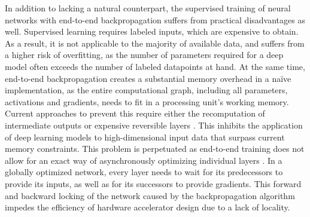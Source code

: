 \documentclass{article}
\begin{document}
In addition to lacking a natural counterpart, the supervised training of neural networks with end-to-end backpropagation suffers from practical disadvantages as well. 
Supervised learning requires labeled inputs, which are expensive to obtain. As a result, it is not applicable to the majority of available data, and suffers from a higher risk of overfitting, as the number of parameters required for a deep model often exceeds the number of labeled datapoints at hand.
At the same time, end-to-end backpropagation creates a substantial memory overhead in a na\"ive implementation, as the entire computational graph, including all parameters, activations and gradients, needs to fit in a processing unit's working memory. Current approaches to prevent this require either the recomputation of intermediate outputs \citep{salimans2017gradient} or expensive reversible layers \citep{Jacobsen2018-ra}. This inhibits the application of deep learning models to high-dimensional input data that surpass current memory constraints. This problem is perpetuated as end-to-end training does not allow for an exact way of asynchronously optimizing individual layers \citep{jaderberg2017decoupled}. In a globally optimized network, every layer needs to wait for its predecessors to provide its inputs, as well as for its successors to provide gradients. This forward and backward locking of the network caused by the backpropagation algorithm impedes the efficiency of hardware accelerator design due to a lack of locality. 
\end{document}
